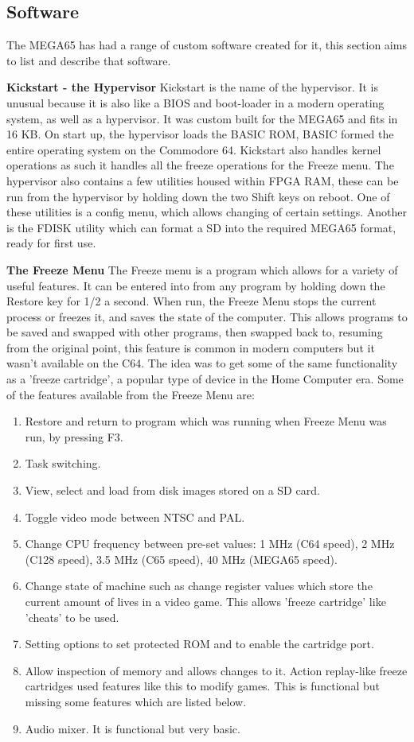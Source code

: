 \subsection{Software}
The MEGA65 has had a range of custom software created for it, this section aims to list and describe that software.

\textbf{Kickstart - the Hypervisor}
Kickstart is the name of the hypervisor. It is unusual because it is also like a BIOS and boot-loader in a modern operating system, as well as a hypervisor. It was custom built for the MEGA65 and fits in 16 KB. On start up, the hypervisor loads the BASIC ROM, BASIC formed the entire operating system on the Commodore 64. Kickstart also handles kernel operations as such it handles all the freeze operations for the Freeze menu. The hypervisor also contains a few utilities housed within FPGA RAM, these can be run from the hypervisor by holding down the two Shift keys on reboot. One of these utilities is a config menu, which allows changing of certain settings. Another is the FDISK utility which can format a SD into the required MEGA65 format, ready for first use.

\textbf{The Freeze Menu}
The Freeze menu is a program which allows for a variety of useful features. It can be entered into from any program by holding down the Restore key for 1/2 a second. When run, the Freeze Menu stops the current process or freezes it, and saves the state of the computer. This allows programs to be saved and swapped with other programs, then swapped back to, resuming from the original point, this feature is common in modern computers but it wasn't available on the C64. The idea was to get some of the same functionality as a 'freeze cartridge', a popular type of device in the Home Computer era. Some of the features available from the Freeze Menu are:
\begin{enumerate}
\item Restore and return to program which was running when Freeze Menu was run, by pressing F3.
\item Task switching.
\item View, select and load from disk images stored on a SD card.
\item Toggle video mode between NTSC and PAL.
\item Change CPU frequency between pre-set values: 1 MHz (C64 speed), 2 MHz (C128 speed), 3.5 MHz (C65 speed), 40 MHz (MEGA65 speed).
\item Change state of machine such as change register values which store the current amount of lives in a video game. This allows 'freeze cartridge' like 'cheats' to be used.
\item Setting options to set protected ROM and to enable the cartridge port.
\item Allow inspection of memory and allows changes to it. Action replay-like freeze cartridges used features like this to modify games. This is functional but missing some features which are listed below.
\item Audio mixer. It is functional but very basic.
\end{enumerate}

